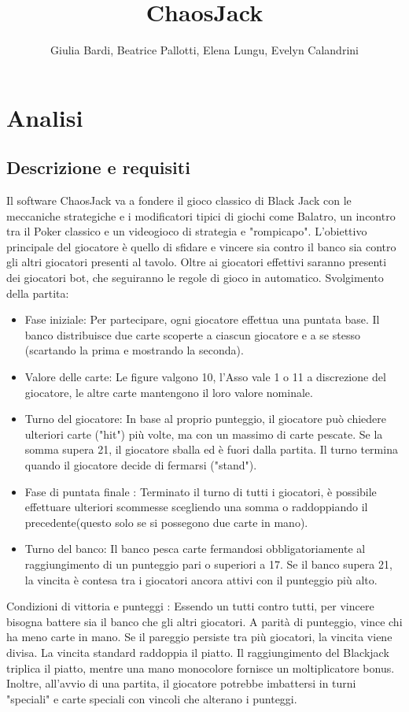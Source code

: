 \documentclass[a4paper,12pt]{report}
\title{ChaosJack}
\author{Giulia Bardi, Beatrice Pallotti, Elena Lungu, Evelyn Calandrini}
\date{}
\begin{document}
\maketitle

\tableofcontents

\chapter{Analisi}

\section{Descrizione e requisiti}
Il software ChaosJack va a fondere il gioco classico di Black Jack con le meccaniche strategiche e i modificatori tipici di giochi come Balatro, un incontro tra il Poker classico 
e un videogioco di strategia e "rompicapo". L'obiettivo principale del giocatore è quello di sfidare e vincere sia contro il banco sia contro gli altri giocatori presenti al tavolo. Oltre ai giocatori effettivi saranno presenti dei giocatori bot, che seguiranno le regole di gioco in automatico.
Svolgimento della partita: 
\begin{itemize}
	\item Fase iniziale: Per partecipare, ogni giocatore effettua una puntata base. Il banco distribuisce due carte scoperte a ciascun giocatore e a se stesso (scartando la prima e mostrando la seconda).
	\item Valore delle carte: Le figure valgono 10, l'Asso vale 1 o 11 a discrezione del giocatore, le altre carte mantengono il loro valore nominale.
	\item Turno del giocatore: In base al proprio punteggio, il giocatore può chiedere ulteriori carte ("hit") più volte, ma con un massimo di carte pescate. Se la somma supera 21, il giocatore sballa ed è fuori dalla partita. Il turno termina quando il giocatore decide di fermarsi ("stand").
	\item Fase di puntata finale : Terminato il turno di tutti i giocatori, è possibile effettuare ulteriori scommesse scegliendo una somma o raddoppiando il precedente(questo solo se si possegono due carte in mano).
	\item Turno del banco: Il banco pesca carte fermandosi obbligatoriamente al raggiungimento di un punteggio pari o superiori a 17. Se il banco supera 21, la vincita è contesa tra i giocatori ancora attivi con il punteggio più alto.
\end{itemize}
Condizioni di vittoria e punteggi :
Essendo un tutti contro tutti, per vincere bisogna battere sia il banco che gli altri giocatori.  A parità di punteggio, vince chi ha meno carte in mano. Se il pareggio persiste tra più giocatori, la vincita viene divisa. La vincita standard raddoppia il piatto. Il raggiungimento del Blackjack triplica il piatto, mentre una mano monocolore fornisce un moltiplicatore bonus.
Inoltre, all'avvio di una partita, il giocatore potrebbe imbattersi in turni "speciali" e carte speciali con vincoli che alterano i punteggi.
\end{document}
